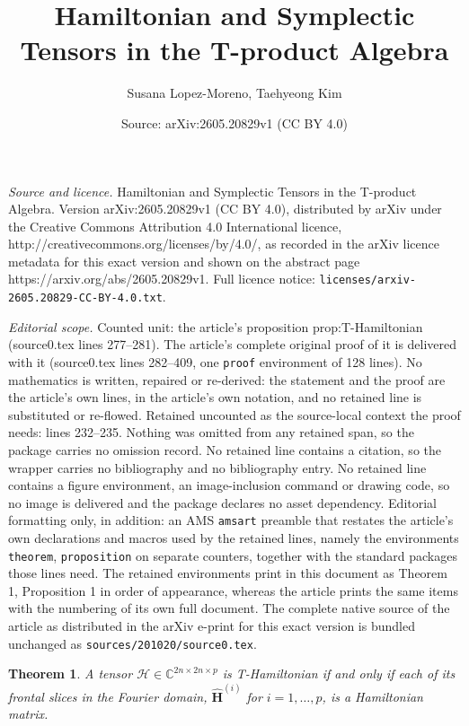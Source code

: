 \documentclass[10pt,a4paper]{amsart}
\title{Hamiltonian and Symplectic Tensors in the T-product Algebra}
\author{Susana Lopez-Moreno, Taehyeong Kim}
\date{Source: arXiv:2605.20829v1 (CC BY 4.0)}
\newtheorem{theorem}{Theorem}
\newcommand{\C}{\mathbb{C}}         %
\newcommand{\M}[1]{\bm{#1}}     %
\newcommand{\T}[1]{\mathcal{#1}}    %
\begin{document}
\maketitle

\noindent\emph{Source and licence.} Hamiltonian and Symplectic Tensors in the T-product Algebra. Version arXiv:2605.20829v1 (CC BY 4.0), distributed by arXiv under the Creative Commons Attribution 4.0 International licence, http://creativecommons.org/licenses/by/4.0/, as recorded in the arXiv licence metadata for this exact version and shown on the abstract page https://arxiv.org/abs/2605.20829v1. Full licence notice: \texttt{licenses/arxiv-2605.20829-CC-BY-4.0.txt}.\par\smallskip

\noindent\textit{Editorial scope.} Counted unit: the article's proposition prop:T-Hamiltonian (source0.tex lines 277--281). The article's complete original proof of it is delivered with it (source0.tex lines 282--409, one \texttt{proof} environment of 128 lines). No mathematics is written, repaired or re-derived: the statement and the proof are the article's own lines, in the article's own notation, and no retained line is substituted or re-flowed.  Retained uncounted as the source-local context the proof needs: lines 232--235.  Nothing was omitted from any retained span, so the package carries no omission record.  No retained line contains a citation, so the wrapper carries no bibliography and no bibliography entry.  No retained line contains a figure environment, an image-inclusion command or drawing code, so no image is delivered and the package declares no asset dependency.  Editorial formatting only, in addition: an AMS \texttt{amsart} preamble that restates the article's own declarations and macros used by the retained lines, namely the environments \texttt{theorem}, \texttt{proposition} on separate counters, together with the standard packages those lines need.  The retained environments print in this document as Theorem 1, Proposition 1 in order of appearance, whereas the article prints the same items with the numbering of its own full document.  The complete native source of the article as distributed in the arXiv e-print for this exact version is bundled unchanged as \texttt{sources/201020/source0.tex}.
\begin{theorem}
\label{thm:hamiltonian_equiv}
A tensor $\T{H} \in \C^{2n \times 2n \times p}$ is T-Hamiltonian if and only if each of its frontal slices in the Fourier domain, $\widehat{\M{H}}^{(i)}$ for $i=1, \dots, p$, is a Hamiltonian matrix.
\end{theorem}
\end{document}
